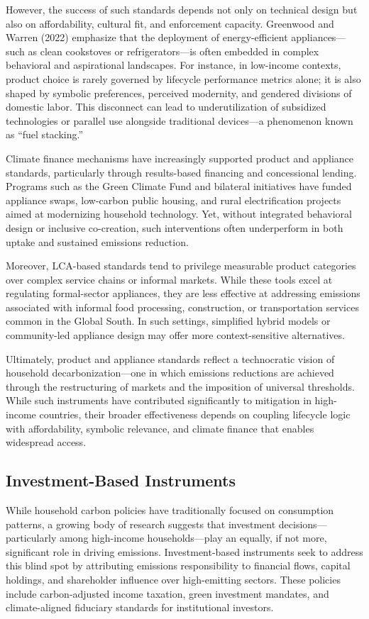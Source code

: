 \documentclass[12pt,a4paper]{article}%
\begin{document}
However, the success of such standards depends not only on technical design but also on affordability, cultural fit, and enforcement capacity. Greenwood and Warren (2022) emphasize that the deployment of energy-efficient appliances—such as clean cookstoves or refrigerators—is often embedded in complex behavioral and aspirational landscapes. For instance, in low-income contexts, product choice is rarely governed by lifecycle performance metrics alone; it is also shaped by symbolic preferences, perceived modernity, and gendered divisions of domestic labor. This disconnect can lead to underutilization of subsidized technologies or parallel use alongside traditional devices—a phenomenon known as “fuel stacking.”

Climate finance mechanisms have increasingly supported product and appliance standards, particularly through results-based financing and concessional lending. Programs such as the Green Climate Fund and bilateral initiatives have funded appliance swaps, low-carbon public housing, and rural electrification projects aimed at modernizing household technology. Yet, without integrated behavioral design or inclusive co-creation, such interventions often underperform in both uptake and sustained emissions reduction.

Moreover, LCA-based standards tend to privilege measurable product categories over complex service chains or informal markets. While these tools excel at regulating formal-sector appliances, they are less effective at addressing emissions associated with informal food processing, construction, or transportation services common in the Global South. In such settings, simplified hybrid models or community-led appliance design may offer more context-sensitive alternatives.

Ultimately, product and appliance standards reflect a technocratic vision of household decarbonization—one in which emissions reductions are achieved through the restructuring of markets and the imposition of universal thresholds. While such instruments have contributed significantly to mitigation in high-income countries, their broader effectiveness depends on coupling lifecycle logic with affordability, symbolic relevance, and climate finance that enables widespread access.

\subsection{Investment-Based Instruments}

While household carbon policies have traditionally focused on consumption patterns, a growing body of research suggests that investment decisions—particularly among high-income households—play an equally, if not more, significant role in driving emissions. Investment-based instruments seek to address this blind spot by attributing emissions responsibility to financial flows, capital holdings, and shareholder influence over high-emitting sectors. These policies include carbon-adjusted income taxation, green investment mandates, and climate-aligned fiduciary standards for institutional investors.
\end{document}
